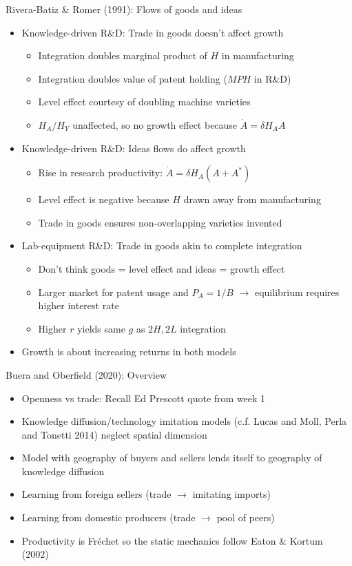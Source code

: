 \documentclass[10pt,notes=hide]{beamer}
\begin{document}
\begin{frame}{Rivera-Batiz \& Romer (1991): Flows of goods and ideas} 
\begin{itemize}
\item Knowledge-driven R\&D: Trade in goods doesn't affect growth
\begin{itemize}
	\item Integration doubles marginal product of $H$ in manufacturing
	\item Integration doubles value of patent holding ($MPH$ in R\&D)
	\item Level effect courtesy of doubling machine varieties
	\item $H_A / H_Y$ unaffected, so no growth effect because $\dot{A} = \delta H_A A$
\end{itemize}
\item Knowledge-driven R\&D: Ideas flows do affect growth
\begin{itemize}
	\item Rise in research productivity: $\dot{A} = \delta H_A (A+A^{*})$
	\item Level effect is negative because $H$ drawn away from manufacturing
	\item Trade in goods ensures non-overlapping varieties invented
\end{itemize}
\item Lab-equipment R\&D: Trade in goods akin to complete integration
\begin{itemize}
	\item Don't think goods = level effect and ideas = growth effect
	\item Larger market for patent usage and $P_A = 1/B$ $\to$ equilibrium requires higher interest rate
	\item Higher $r$ yields same $g$ as $2H,2L$ integration
\end{itemize}
\item Growth is about increasing returns in both models
\end{itemize}
\end{frame}
\begin{frame}{Buera and Oberfield (2020): Overview}
\begin{itemize}
\item Openness vs trade: Recall Ed Prescott quote from week 1
\item Knowledge diffusion/technology imitation models (c.f. Lucas and Moll, Perla and Tonetti 2014) neglect spatial dimension
\item Model with geography of buyers and sellers lends itself to geography of knowledge diffusion
\item Learning from foreign sellers (trade $\to$ imitating imports)
\item Learning from domestic producers (trade $\to$ pool of peers)
\item Productivity is Fr\'{e}chet so the static mechanics follow Eaton \& Kortum (2002)
\end{itemize}
\end{frame}
\end{document}
